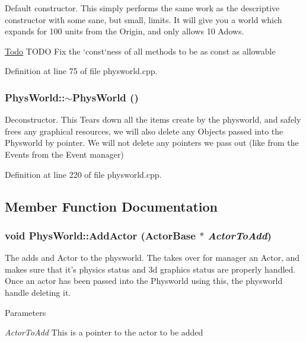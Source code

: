 Default constructor. This simply performs the same work as the descriptive constructor with some sane, but small, limits. It will give you a world which expands for 100 units from the Origin, and only allows 10 Adows.

\begin{Desc}
\item[\hyperlink{todo__todo000007}{Todo}]TODO Fix the `const`ness of all methods to be as const as allowable \end{Desc}


Definition at line 75 of file physworld.cpp.\hypertarget{classPhysWorld_acdfe3b4c1c236860dc7dff945cfe5b07}{
\subsubsection[{$\sim$PhysWorld}]{\setlength{\rightskip}{0pt plus 5cm}PhysWorld::$\sim$PhysWorld ()}}
\label{db/df5/classPhysWorld_acdfe3b4c1c236860dc7dff945cfe5b07}


Deconstructor. This Tears down all the items create by the physworld, and safely frees any graphical resources, we will also delete any Objects passed into the Physworld by pointer. We will not delete any pointers we pass out (like from the Events from the Event manager) 

Definition at line 220 of file physworld.cpp.

\subsection{Member Function Documentation}
\hypertarget{classPhysWorld_ae490054b3e1c4c5aa69cb8e3b7bd2f29}{
\subsubsection[{AddActor}]{\setlength{\rightskip}{0pt plus 5cm}void PhysWorld::AddActor ({\bf ActorBase} $\ast$ {\em ActorToAdd})}}
\label{db/df5/classPhysWorld_ae490054b3e1c4c5aa69cb8e3b7bd2f29}


The adds and Actor to the physworld. The takes over for manager an Actor, and makes sure that it's physics status and 3d graphics status are properly handled. Once an actor has been passed into the Physworld using this, the physworld handle deleting it. 
\begin{DoxyParams}{Parameters}
\item[{\em ActorToAdd}]This is a pointer to the actor to be added \end{DoxyParams}


